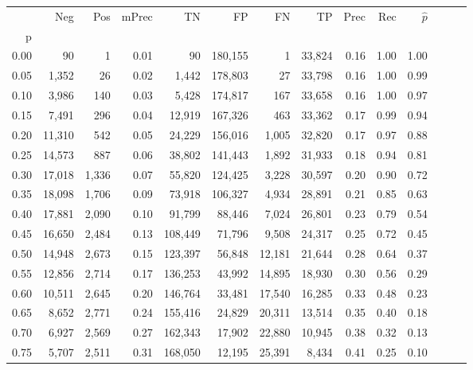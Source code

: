\begin{tabular}{rrrrrrrrrrrrrr}
\toprule
{} &     Neg &    Pos & mPrec &       TN &       FP &      FN &      TP &  Prec &   Rec & $\hat{p}$ \\
p    &         &        &       &          &          &         &         &       &       &           \\
\midrule
0.00 &      90 &      1 &  0.01 &       90 &  180,155 &       1 &  33,824 &  0.16 &  1.00 &      1.00 \\
0.05 &   1,352 &     26 &  0.02 &    1,442 &  178,803 &      27 &  33,798 &  0.16 &  1.00 &      0.99 \\
0.10 &   3,986 &    140 &  0.03 &    5,428 &  174,817 &     167 &  33,658 &  0.16 &  1.00 &      0.97 \\
0.15 &   7,491 &    296 &  0.04 &   12,919 &  167,326 &     463 &  33,362 &  0.17 &  0.99 &      0.94 \\
0.20 &  11,310 &    542 &  0.05 &   24,229 &  156,016 &   1,005 &  32,820 &  0.17 &  0.97 &      0.88 \\
0.25 &  14,573 &    887 &  0.06 &   38,802 &  141,443 &   1,892 &  31,933 &  0.18 &  0.94 &      0.81 \\
0.30 &  17,018 &  1,336 &  0.07 &   55,820 &  124,425 &   3,228 &  30,597 &  0.20 &  0.90 &      0.72 \\
0.35 &  18,098 &  1,706 &  0.09 &   73,918 &  106,327 &   4,934 &  28,891 &  0.21 &  0.85 &      0.63 \\
0.40 &  17,881 &  2,090 &  0.10 &   91,799 &   88,446 &   7,024 &  26,801 &  0.23 &  0.79 &      0.54 \\
0.45 &  16,650 &  2,484 &  0.13 &  108,449 &   71,796 &   9,508 &  24,317 &  0.25 &  0.72 &      0.45 \\
0.50 &  14,948 &  2,673 &  0.15 &  123,397 &   56,848 &  12,181 &  21,644 &  0.28 &  0.64 &      0.37 \\
0.55 &  12,856 &  2,714 &  0.17 &  136,253 &   43,992 &  14,895 &  18,930 &  0.30 &  0.56 &      0.29 \\
0.60 &  10,511 &  2,645 &  0.20 &  146,764 &   33,481 &  17,540 &  16,285 &  0.33 &  0.48 &      0.23 \\
0.65 &   8,652 &  2,771 &  0.24 &  155,416 &   24,829 &  20,311 &  13,514 &  0.35 &  0.40 &      0.18 \\
0.70 &   6,927 &  2,569 &  0.27 &  162,343 &   17,902 &  22,880 &  10,945 &  0.38 &  0.32 &      0.13 \\
0.75 &   5,707 &  2,511 &  0.31 &  168,050 &   12,195 &  25,391 &   8,434 &  0.41 &  0.25 &      0.10 \\

\end{tabular}
